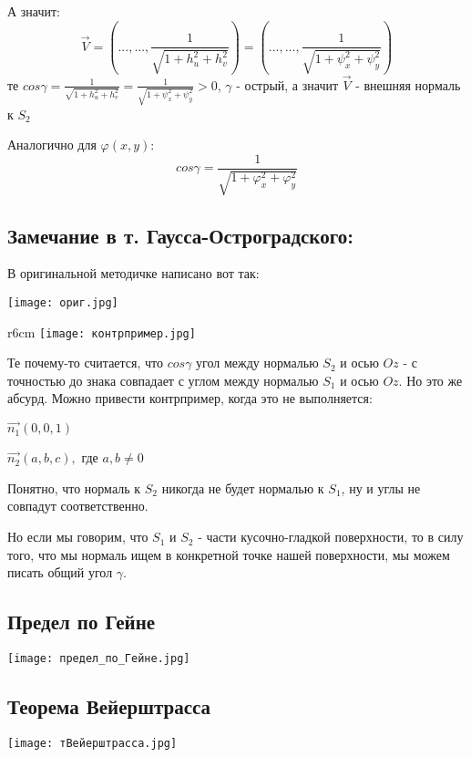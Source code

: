 \documentclass[12pt]{article}
\begin{document}
А значит:
$$
\vec{V} = ( ..., ... , \frac{1}{\sqrt{1+h_u^2 + h_v^2}})
=
( ..., ... , \frac{1}{\sqrt{1+\psi_x^2 + \psi_y^2}})
$$
те $cos\gamma = \frac{1}{\sqrt{1+h_u^2 + h_v^2}} = \frac{1}{\sqrt{1+\psi_x^2 + \psi_y^2}}> 0$, $\gamma$ - острый, а значит $\vec{V}$ - внешняя нормаль к $S_2$

Аналогично для $\varphi(x,y)$:
$$cos\gamma = \frac{1}{\sqrt{1 + \varphi_x^2 + \varphi_y^2 }} $$

\subsection{Замечание в т. Гаусса-Остроградского:}\label{eq11}
	В оригинальной методичке написано вот так:
	
	\texttt{[image: ориг.jpg]}	
		\begin{wrapfigure}{r}{6cm}
	\texttt{[image: контрпример.jpg]}
	\end{wrapfigure}
	
	Те почему-то считается, что $cos\gamma$ угол между нормалью $S_2$ и осью $Oz$ - с точностью до знака совпадает с углом между нормалью $S_1$ и осью $Oz$. Но это же абсурд. Можно привести контрпример, когда это не выполняется:
	

	$\vec{n_1}(0 , 0 , 1)$
	
	$\vec{n_2}(a , b , c), $ где $a,b \neq 0$

	Понятно, что нормаль к $S_2$ никогда не будет нормалью к $S_1$, ну и углы не совпадут соответственно.
	
	Но если мы говорим, что $S_1$ и $S_2$ - части кусочно-гладкой поверхности, то в силу того, что мы нормаль ищем в конкретной точке нашей поверхности, мы можем писать общий угол $\gamma$.
\newpage

\subsection{Предел по Гейне} \label{eq201}
	\texttt{[image: предел\_по\_Гейне.jpg]}

\subsection{Теорема Вейерштрасса} \label{eq202}

	\texttt{[image: тВейерштрасса.jpg]}
	
	
\end{document}
